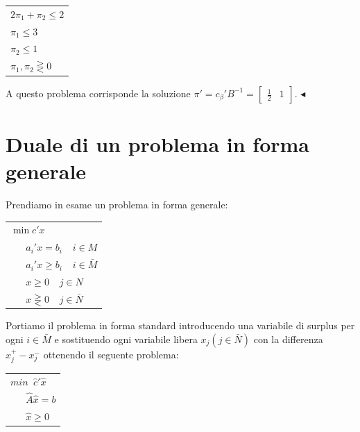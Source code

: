 \documentclass[11pt]{book}
\begin{document}
\begin{center}
\begin{tabular}{l}
$2\pi_1 + \pi_2 \leq 2$ \\
$\pi_1 \leq 3$ \\
$\pi_2 \leq 1$ \\
$\pi_1, \pi_2 \gtreqless 0$\\
\end{tabular}
\end{center}

A questo problema corrisponde la soluzione $\pi' = c_\beta'B^{-1}
= \begin{bmatrix}\frac{1}{2} & 1\end{bmatrix}$. $\blacktriangleleft$
\vspace{11pt}

\section{Duale di un problema in forma generale}

Prendiamo in esame un problema in forma generale:

  \begin{center}
    \begin{tabular}{l}
      $\min c'x$ \\
      $\phantom{aaa}a_i'x = b_i \phantom{aa} i \in M$ \\
      $\phantom{aaa}a_i'x \geq b_i \phantom{aa} i \in \bar{M}$ \\
      $\phantom{aaa}x \geq 0\phantom{aa} j \in N$\\      
      $\phantom{aaa}x \gtreqless 0\phantom{aa} j \in \bar{N}$\\      
    \end{tabular}
  \end{center}

Portiamo il problema in forma standard introducendo una variabile di
surplus per ogni $i \in \bar{M}$ e sostituendo ogni variabile libera
$x_j (j \in \bar{N})$ con la differenza $x_j^+-x_j^-$ ottenendo il
seguente problema:

  \begin{center}
    \begin{tabular}{l}
      $min\phantom{a}\hat{c}'\hat{x}$ \\
      $\phantom{aaa}\hat{A}\hat{x} = b$ \\
      $\phantom{aaa}\hat{x} \geq 0$ \\      
    \end{tabular}
  \end{center}
\end{document}

